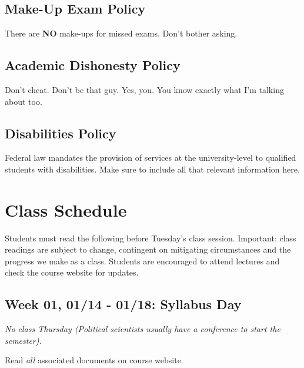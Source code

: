 \documentclass[11pt,]{article}
\begin{document}
\hypertarget{make-up-exam-policy}{%
\subsection{Make-Up Exam Policy}\label{make-up-exam-policy}}

There are \textbf{NO} make-ups for missed exams. Don't bother asking.

\hypertarget{academic-dishonesty-policy}{%
\subsection{Academic Dishonesty
Policy}\label{academic-dishonesty-policy}}

Don't cheat. Don't be that guy. Yes, you. You know exactly what I'm
talking about too.

\hypertarget{disabilities-policy}{%
\subsection{Disabilities Policy}\label{disabilities-policy}}

Federal law mandates the provision of services at the university-level
to qualified students with disabilities. Make sure to include all that
relevant information here.

\newpage

\hypertarget{class-schedule}{%
\section{Class Schedule}\label{class-schedule}}

Students must read the following before Tuesday's class session.
Important: class readings are subject to change, contingent on
mitigating circumstances and the progress we make as a class. Students
are encouraged to attend lectures and check the course website for
updates.

\hypertarget{week-01-0114---0118-syllabus-day}{%
\subsection{Week 01, 01/14 - 01/18: Syllabus
Day}\label{week-01-0114---0118-syllabus-day}}

\emph{No class Thursday (Political scientists usually have a conference
to start the semester).}

Read \emph{all} associated documents on course website.
\end{document}
